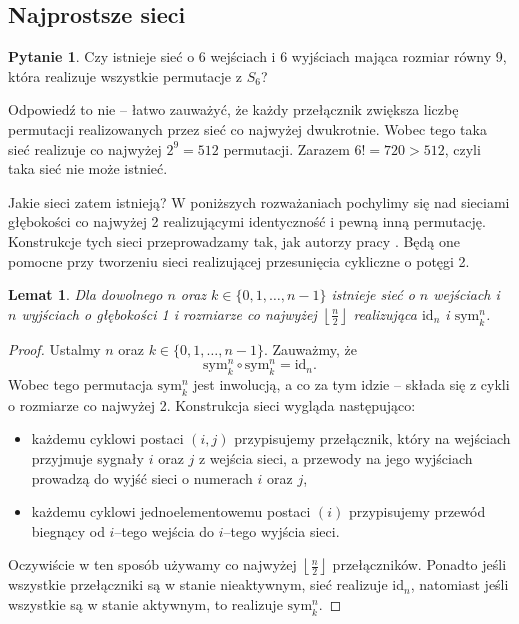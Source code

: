 \documentclass[a4paper]{article}
\newcommand{\sym}[2]{\text{sym}_{#2}^{#1}}
\newcommand{\id}[1]{\text{id}_{#1}}
\newcommand{\td}{\text{.}}
\newcommand{\floor}[1]{\left\lfloor #1 \right\rfloor}
\newtheorem{lem}[tw]{Lemat}
\theoremstyle{definition}
\newtheorem*{pyt}{Pytanie}
\begin{document}
\subsection{Najprostsze sieci}

\begin{pyt}
    Czy istnieje sieć o 6 wejściach i 6 wyjściach mająca rozmiar równy 9, która realizuje wszystkie permutacje z \(S_6\)?
\end{pyt}

Odpowiedź to nie -- łatwo zauważyć, że każdy przełącznik zwiększa liczbę permutacji realizowanych przez sieć co najwyżej dwukrotnie. Wobec tego taka sieć realizuje co najwyżej \(2^9 = 512\) permutacji. Zarazem \(6! = 720 > 512\),  czyli taka sieć nie może istnieć. 

\vspace{1em}

Jakie sieci zatem istnieją? W poniższych rozważaniach pochylimy się nad sieciami głębokości co najwyżej 2 realizującymi identyczność i pewną inną permutację. Konstrukcje tych sieci przeprowadzamy tak, jak autorzy pracy \cite{klo}. Będą one pomocne przy tworzeniu sieci realizującej przesunięcia cykliczne o potęgi 2. 

\begin{lem}\label{lem:perm_symetrie}
    Dla dowolnego \(n\) oraz \(k \in \{0, 1, \ldots, n-1\}\) istnieje sieć o \(n\) wejściach i \(n\) wyjściach o głębokości 1 i rozmiarze co najwyżej \(\floor{\frac n 2}\) realizująca \(\id{n}\) i \(\sym{n}{k}\).
\end{lem}

\begin{proof}
    Ustalmy \(n\) oraz \(k \in \{0, 1, \ldots, n-1\}\). Zauważmy, że 
    \[
    \sym{n}{k} \circ \sym{n}{k} = \id{n} \td
    \]
    Wobec tego permutacja \(\sym n k\) jest inwolucją, a co za tym idzie -- składa się z cykli o rozmiarze co najwyżej 2. Konstrukcja sieci wygląda następująco:
    \begin{itemize}
        \item każdemu cyklowi postaci \((i,j)\) przypisujemy przełącznik, który na wejściach przyjmuje sygnały \(i\) oraz \(j\) z wejścia sieci, a przewody na jego wyjściach prowadzą do wyjść sieci o numerach \(i\) oraz \(j\),
        \item każdemu cyklowi jednoelementowemu postaci \((i)\) przypisujemy przewód biegnący od \(i\)--tego wejścia do \(i\)--tego wyjścia sieci.
    \end{itemize}
    Oczywiście w ten sposób używamy co najwyżej \(\floor{\frac{n}{2}}\) przełączników. 
    Ponadto jeśli wszystkie przełączniki są w stanie nieaktywnym, sieć realizuje \(\id n\), natomiast jeśli wszystkie są w stanie aktywnym, to realizuje \(\sym n k\).
\end{proof}
\end{document}
